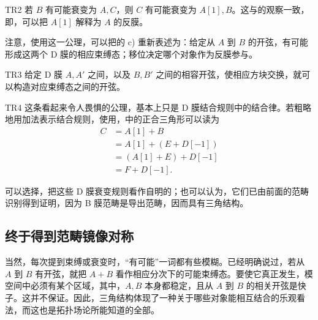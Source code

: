 \begin{letteraxiom}{TR2}\label{interpretation:5.TR2}
若 $B$ 有可能衰变为 $A,C$，则 $C$ 有可能衰变为 $A[1],B$。这与的观察一致，即，可以把 $A[1]$ 解释为 $A$ 的反膜。

注意，使用这一公理，可以把的 c) 重新表述为：给定从 $A$ 到 $B$ 的开弦，有可能形成这两个 D 膜的相应束缚态；移位决定哪个对象作为反膜参与。
\end{letteraxiom}

\begin{letteraxiom}{TR3}\label{interpretation:5.TR3}
给定 D 膜 $A,A'$ 之间，以及 $B,B'$ 之间的相容开弦，使相应方块交换，就可以构造对应束缚态之间的开弦。
\end{letteraxiom}

\begin{letteraxiom}{TR4}\label{interpretation:5.TR4}
这条看起来令人畏惧的公理，基本上只是 D 膜结合规则中的结合律。若粗略地用加法表示结合规则，使用，中的正合三角形可以读为
\begin{equation}\label{eq:5.126}
\begin{aligned}
C&=A[1]+B\\
&=A[1]+(E+D[-1])\\
&=(A[1]+E)+D[-1]\\
&=F+D[-1].
\end{aligned}
\end{equation}
\end{letteraxiom}

可以选择，把这些 D 膜衰变规则看作自明的；也可以认为，它们已由前面的范畴识别得到证明，因为 B 膜范畴是导出范畴，因而具有三角结构。

\subsection{终于得到范畴镜像对称}\label{sec:5.5.2}

当然，每次提到束缚或衰变时，“有可能”一词都有些模糊。已经明确说过，若从 $A$ 到 $B$ 有开弦，就把 $A+B$ 看作相应分次下的可能束缚态。要使它真正发生，模空间中必须有某个区域，其中，$A,B$ 本身都稳定，且从 $A$ 到 $B$ 的相关开弦是快子。这并不保证。因此，三角结构体现了一种关于哪些对象能相互结合的乐观看法，而这也是拓扑场论所能知道的全部。

